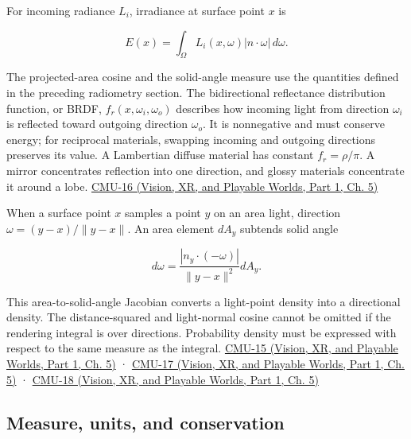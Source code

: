 \hypertarget{03-visual-computing-i-ch004-radiometry-and-brdf}{}

For incoming radiance \(L_i\), irradiance at surface point \(x\) is

\[
E(x)=\int_\Omega L_i(x,\omega)|n\cdot\omega|\,d\omega.
\]

The projected-area cosine and the solid-angle measure use the quantities defined in the preceding radiometry section. The bidirectional reflectance distribution function, or BRDF, \(f_r(x,\omega_i,\omega_o)\) describes how incoming light from direction \(\omega_i\) is reflected toward outgoing direction \(\omega_o\). It is nonnegative and must conserve energy; for reciprocal materials, swapping incoming and outgoing directions preserves its value. A Lambertian diffuse material has constant \(f_r=\rho/\pi\). A mirror concentrates reflection into one direction, and glossy materials concentrate it around a lobe. \href{../07-Vision-XR-and-Playable-Worlds-P01/main.pdf\#nameddest=04-visual-computing-ii-ch036-cmu-16---the-rendering-equation}{CMU-16 (Vision, XR, and Playable Worlds, Part 1, Ch. 5)}

When a surface point \(x\) samples a point \(y\) on an area light, direction \(\omega=(y-x)/\|y-x\|\). An area element \(dA_y\) subtends solid angle

\[
d\omega=\frac{|n_y\cdot(-\omega)|}{\|y-x\|^2}dA_y.
\]

This area-to-solid-angle Jacobian converts a light-point density into a directional density. The distance-squared and light-normal cosine cannot be omitted if the rendering integral is over directions. Probability density must be expressed with respect to the same measure as the integral. \href{../07-Vision-XR-and-Playable-Worlds-P01/main.pdf\#nameddest=04-visual-computing-ii-ch036-cmu-15---radiometry}{CMU-15 (Vision, XR, and Playable Worlds, Part 1, Ch. 5)} · \href{../07-Vision-XR-and-Playable-Worlds-P01/main.pdf\#nameddest=04-visual-computing-ii-ch036-cmu-17---numerical-integration}{CMU-17 (Vision, XR, and Playable Worlds, Part 1, Ch. 5)} · \href{../07-Vision-XR-and-Playable-Worlds-P01/main.pdf\#nameddest=04-visual-computing-ii-ch036-cmu-18---monte-carlo-rendering}{CMU-18 (Vision, XR, and Playable Worlds, Part 1, Ch. 5)}

\subsection{Measure, units, and conservation}\label{03-visual-computing-i-ch004-measure-units-and-conservation}

